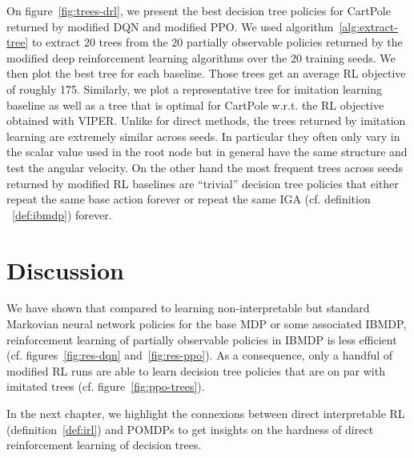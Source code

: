 On figure~\ref{fig:trees-drl}, we present the best decision tree policies for CartPole returned by modified DQN and modified PPO.
We used algorithm~\ref{alg:extract-tree} to extract 20 trees from the 20 partially observable policies returned by the modified deep reinforcement learning algorithms over the 20 training seeds.
We then plot the best tree for each baseline.
Those trees get an average RL objective of roughly 175.
Similarly, we plot a representative tree for imitation learning baseline as well as a tree that is optimal for CartPole w.r.t. the RL objective obtained with VIPER. 
Unlike for direct methods, the trees returned by imitation learning are extremely similar across seeds. In particular they often only vary in the scalar value used in the root node but in general have the same structure and test the angular velocity.
On the other hand the most frequent trees across seeds returned by modified RL baselines are ``trivial'' decision tree policies that either repeat the same base action forever or repeat the same IGA (cf. definition ~\ref{def:ibmdp}) forever.


\section{Discussion}
We have shown that compared to learning non-interpretable but standard Markovian neural network policies for the base MDP or some associated IBMDP, reinforcement learning of partially observable policies in IBMDP is less efficient (cf. figures~\ref{fig:res-dqn} and~\ref{fig:res-ppo}). 
As a consequence, only a handful of modified RL runs are able to learn decision tree policies that are on par with imitated trees (cf. figure~\ref{fig:ppo-trees}).

In the next chapter, we highlight the connexions between direct interpretable RL (definition~\ref{def:irl}) and POMDPs to get insights on the hardness of direct reinforcement learning of decision trees.